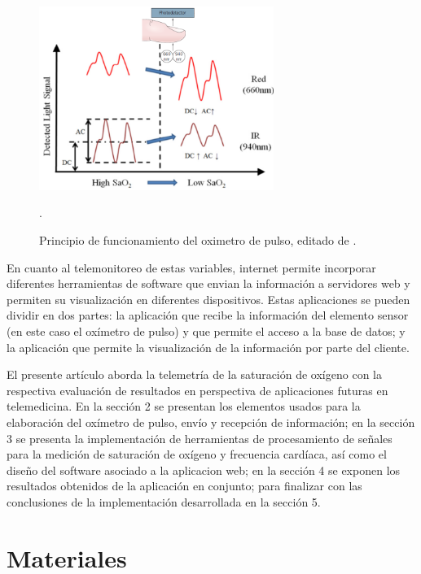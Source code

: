\documentclass[journal]{IEEEtran}
\begin{document}
\begin{figure}[!h]
	\centering
	\includegraphics[width=3in]{principio_funcionamiento.png}
	\caption{Principio de funcionamiento del oximetro de pulso, editado de \cite{B_reflectance_pulse_oximetry}. }.
	\label{principio_funcionamiento}
\end{figure}


En cuanto al telemonitoreo de estas variables, internet permite incorporar diferentes herramientas de software que envian la información a servidores web y permiten su visualización en diferentes dispositivos.  Estas aplicaciones se pueden dividir en dos partes: la aplicación que recibe la información del elemento sensor (en este caso el oxímetro de pulso) y que permite el acceso a la base de datos; y la aplicación que permite la visualización de la información por parte del cliente.

El presente artículo aborda la telemetría de la saturación de oxígeno con la respectiva evaluación de resultados en perspectiva de aplicaciones futuras en telemedicina. En la sección 2 se presentan los elementos usados para la elaboración del oxímetro de pulso, envío y recepción de información; en la sección 3 se presenta la implementación de herramientas de procesamiento de señales para la medición de saturación de oxígeno y frecuencia cardíaca, así como el diseño del software asociado a la aplicacion web; en la sección 4 se exponen los resultados obtenidos de la aplicación en conjunto; para finalizar con las conclusiones  de la implementación desarrollada en la sección 5.










\section{Materiales}
\end{document}
